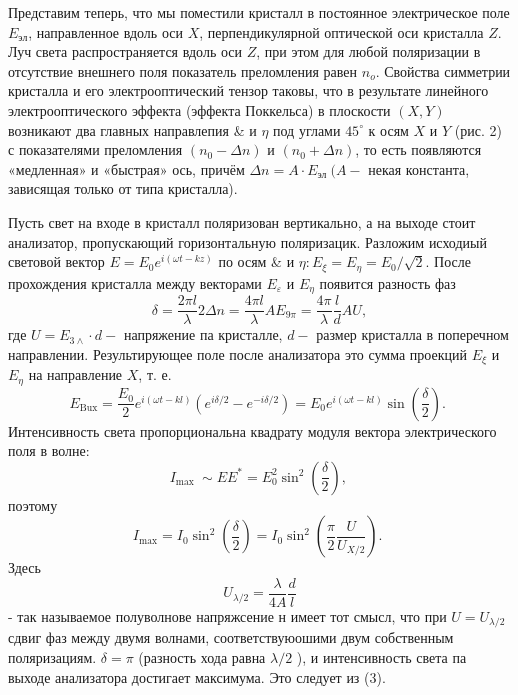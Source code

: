 \documentclass[a4paper, 12pt]{article}
\begin{document}
Представим теперь, что мы поместили кристалл в постоянное электрическое поле $E_{э л}$, направленное вдоль оси $X$, перпендикулярной оптической оси кристалла $Z$. Луч света распространяется вдоль оси $Z$, при этом для любой поляризации в отсутствие внешнего поля показатель преломления равен $n_o$. Свойства симметрии кристалла и его электрооптический тензор таковы, что в результате линейного электрооптического эффекта (эффекта Поккельса) в плоскости $(X, Y)$ возникают два главных направлепия \& и $\eta$ под углами $45^{\circ}$ к осям $X$ и $Y$ (рис. 2) с показателями преломления $\left(n_0-\Delta n\right)$ и $\left(n_0+\Delta n\right)$, то есть появляются «медленная» и «быстрая» ось, причём $\Delta n=A \cdot E_{\text {эл }}(A-$ некая константа, зависящая только от типа кристалла).

Пусть свет на входе в кристалл поляризован вертикально, а на выходе стоит анализатор, пропускающий горизонтальную поляризацик. Разложим исходиый световой вектор $E=E_0 e^{i(\omega t-k z)}$ по осям \& и $\eta: E_{\xi}=E_\eta=E_0 / \sqrt{2}$. После прохождения кристалла между векторами $E_{\varepsilon}$ и $E_\eta$ появится разность фаз
\begin{equation*}
\delta=\frac{2 \pi l}{\lambda} 2 \Delta n=\frac{4 \pi l}{\lambda} A E_{9 \pi}=\frac{4 \pi}{\lambda} \frac{l}{d} A U,
\end{equation*}
где $U=E_{3 \wedge} \cdot d-$ напряжение па кристалле, $d-$ размер кристалла в поперечном направлении. Результирующее поле после анализатора это сумма проекций $E_{\xi}$ и $E_\eta$ на направление $X$, т. е.
\begin{equation*}
E_{\mathrm{Bux}}=\frac{E_0}{2} e^{i(\omega t-k l)}\left(e^{i \delta / 2}-e^{-i \delta / 2}\right)=E_0 e^{i(\omega t-k l)} \sin \left(\frac{\delta}{2}\right) \text {. }
\end{equation*}
Интенсивность света пропорциональна квадрату модуля вектора электрического поля в волне:
\begin{equation*}
I_{\text {max }} \sim E E^*=E_0^2 \sin ^2\left(\frac{\delta}{2}\right) \text {, }
\end{equation*}
поэтому
\begin{equation}
I_{\mathrm{max}}=I_0 \sin ^2\left(\frac{\delta}{2}\right)=I_0 \sin ^2\left(\frac{\pi}{2} \frac{U}{U_{X / 2}}\right) \text {. }
\end{equation}
Здесь
\begin{equation}
U_{\lambda / 2}=\frac{\lambda}{4 A} \frac{d}{l}
\end{equation}
- так называемое полуволнове напряжсение н имеет тот смысл, что при $U=U_{\lambda / 2}$ сдвиг фаз между двумя волнами, соответствуюошими двум собственным поляризациям. $\delta=\pi$ (разность хода равна $\lambda / 2$ ), и интенсивность света па выходе анализатора достигает максимума. Это следует из (3).
\end{document}

